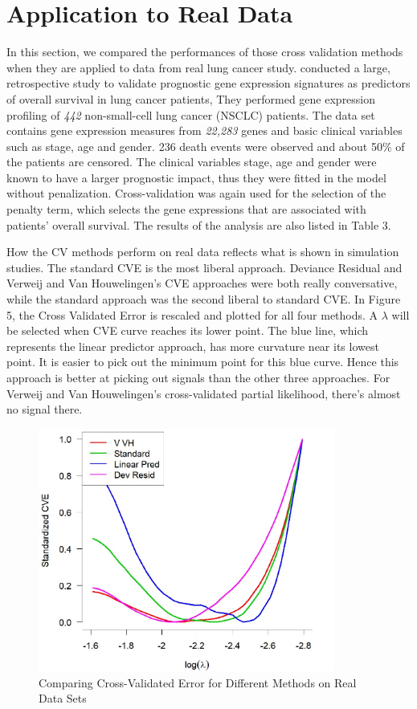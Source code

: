 \section{Application to Real Data}

\par In this section, we compared the performances of those cross validation methods when they are applied to data from real lung cancer study. \cite{shedden2008gene} conducted a large, retrospective study to validate prognostic gene expression signatures as predictors of overall survival in lung cancer patients, They performed gene expression profiling of \textit{442} non-small-cell lung cancer (NSCLC) patients. The data set contains gene expression measures from \textit{22,283} genes and basic clinical variables such as stage, age and gender. 236 death events were observed and about 50$\%$ of the patients are censored. The clinical variables stage, age and gender were known to have a larger prognostic impact, thus they were fitted in the model without penalization. Cross-validation was again used for the selection of the penalty term, which selects the gene expressions that are associated with patients' overall survival. The results of the analysis are also listed in Table 3.

\par How the CV methods perform on real data reflects what is shown in simulation studies. The standard CVE is the most liberal approach. Deviance Residual and Verweij and Van Houwelingen's CVE approaches were both really conversative, while the standard approach was the second liberal to standard CVE. In Figure 5, the Cross Validated Error is rescaled and plotted for all four methods. A $\lambda$ will be selected when CVE curve reaches its lower point. The blue line, which represents the linear predictor approach, has more curvature near its lowest point. It is easier to pick out the minimum point for this blue curve. Hence this approach is better at picking out signals than the other three approaches. For Verweij and Van Houwelingen's cross-validated partial likelihood, there's almost no signal there.

\begin{figure}[h]
    \centering
		\includegraphics[height= 8cm ]{./figures/shedden.jpg}
    \caption{Comparing Cross-Validated Error for Different Methods on Real Data Sets}
\end{figure}	


